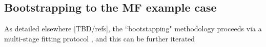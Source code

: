 \subsection{Bootstrapping to the MF example case}

As detailed elsewhere [TBD/refs], the ``bootstapping" methodology proceeds via a multi-stage fitting protocol , and this can be further iterated
